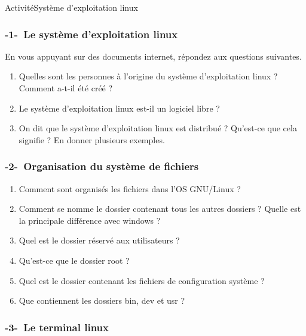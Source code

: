 \documentclass[11pt,a4paper]{article}
\begin{document}
\begin{NSI}
{Activité}{Système d'exploitation linux}
\end{NSI}

\subsubsection*{-1-~Le système d'exploitation linux}
En vous appuyant sur des documents internet, répondez aux questions suivantes.
\begin{enumerate}
\item Quelles sont les personnes à l'origine du système d'exploitation linux ? Comment a-t-il été créé ?

\item Le système d'exploitation linux est-il un logiciel libre ?

\item On dit que le système d'exploitation linux est distribué ? Qu'est-ce que cela signifie ? En donner plusieurs exemples.

\end{enumerate}

\subsubsection*{-2-~Organisation du système de fichiers}
\begin{enumerate}
\item Comment sont organisés les fichiers dans l'OS GNU/Linux ?

\item Comment se nomme le dossier contenant tous les autres dossiers ? Quelle est la principale différence avec windows ?

\item Quel est le dossier réservé aux utilisateurs ?


\item Qu'est-ce que le dossier root ?


\item Quel est le dossier contenant les fichiers de configuration système ?

\item Que contiennent les dossiers bin, dev et usr ?
\end{enumerate}


\subsubsection*{-3-~Le terminal linux}
\end{document}
